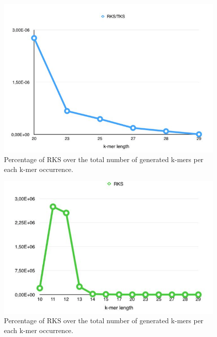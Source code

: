 \documentclass[11pt]{article}
\begin{document}
\begin{figure}
    \centering
    \includegraphics[scale=0.60]{image/2}
    \caption{Percentage of RKS over the total number of generated k-mers per each k-mer occurrence.}
    \label{fig:2}
\end{figure}
\begin{figure}
    \centering
    \includegraphics[scale=0.60]{image/3}
    \caption{Percentage of RKS over the total number of generated k-mers per each k-mer occurrence.}
    \label{fig:3}
\end{figure}
%
\end{document}
